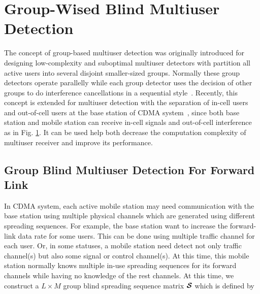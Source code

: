\documentclass[a4paper,11pt,fleqn]{article}
\newcommand{\bcS}{{\mbox {\boldmath ${\cal S}$}}}
\begin{document}
\pagebreak




\section{Group-Wised Blind Multiuser Detection}
The concept of group-based multiuser detection was originally
introduced for designing low-complexity and suboptimal multiuser
detectors with partition all active users into several disjoint
smaller-sized groups. Normally these group detectors operate
parallelly while each group detector uses the decision of other
groups to do interference cancellations in a sequential
style~\cite{Mahesh95}. Recently, this concept is extended for
multiuser detection with the separation of in-cell users and
out-of-cell users at the base station of CDMA
system~\cite{Wang99A}, since both base station and mobile station
can receive in-cell signals and out-of-cell interference as in
Fig. \ref{CDMA_grouplinks}. It can be used help both decrease the
computation complexity of multiuser receiver and improve its
performance.

\begin{figure}
\label{CDMA_grouplinks}
\end{figure}


\subsection{Group Blind Multiuser Detection For Forward Link}
In CDMA system, each active mobile station may need communication
with the base station using multiple physical channels which are
generated using different spreading sequences. For example, the
base station want to increase the forward-link data rate for some
users. This can be done using multiple traffic channel for each
user. Or, in some statuses, a mobile station need detect not only
traffic channel(s) but also some signal or control channel(s). At
this time, this mobile station normally knows multiple in-use
spreading sequences for its forward channels while having no
knowledge of the rest channels. At this time, we construct a
$L\times M$ group blind spreading sequence matrix $\bcS$ which is
defined by
\end{document}

